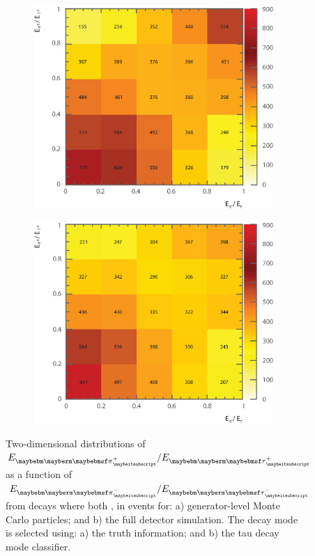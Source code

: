 \begin{figure}[htbp]
\centering %
\begin{subfigure}[b]{0.7\textwidth}
  \includegraphics[width=\textwidth]{tau/NoTimeAnalysis/2DMC2}
  \caption{}
  \label{fig:TauSpin2DMC}
\end{subfigure}
\begin{subfigure}[b]{0.7\textwidth}
  \includegraphics[width=\textwidth]{tau/NoTimeAnalysis/2Dreco2}
  \caption{}
  \label{fig:TauSpin2Dreco}
\end{subfigure}
\caption
{Two-dimensional distributions of $E_{\Ppiplus}/E_{\APtauon}$ as a function of $E_{\Ppiminus}/E_{\Ptauon}$ from \ZToTauTau decays where both \tauToPionBoth, in \eeZZQQ events for: a) generator-level  Monte Carlo particles; and b) the full detector simulation. The \tauToPionBoth decay mode is selected using: a) the truth information; and b) the tau decay mode classifier.}
\label{fig:TauSpin2D}
\end{figure}

